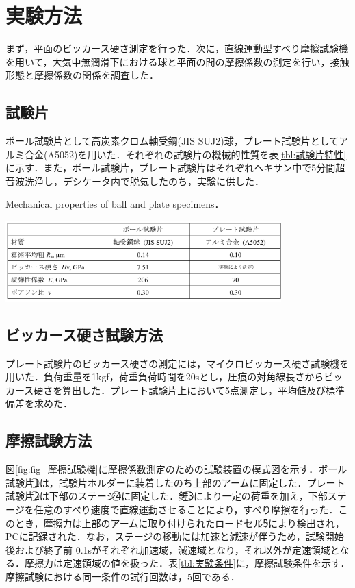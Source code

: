 \section{実験方法}
まず，平面のビッカース硬さ測定を行った．次に，直線運動型すべり摩擦試験機を用いて，大気中無潤滑下における球と平面の間の摩擦係数の測定を行い，接触形態と摩擦係数の関係を調査した．

\subsection{試験片}
ボール試験片として高炭素クロム軸受鋼(JIS SUJ2)球，プレート試験片としてアルミ合金(A5052)を用いた．それぞれの試験片の機械的性質を表\ref{tbl:試験片特性}に示す．また，ボール試験片，プレート試験片はそれぞれヘキサン中で5分間超音波洗浄し，デシケータ内で脱気したのち，実験に供した．

\begin{table}[htbp]
    \centering
    \caption{Mechanical properties of ball and plate specimens．} %
    \label{tbl:試験片特性} %
    \includegraphics[width=0.8\textwidth]{fig/fig_試験片特性.png} %
\end{table}

\subsection{ビッカース硬さ試験方法}
プレート試験片のビッカース硬さの測定には，マイクロビッカース硬さ試験機を用いた．負荷重量を1kgf，荷重負荷時間を20sとし，圧痕の対角線長さからビッカース硬さを算出した．プレート試験片上において5点測定し，平均値及び標準偏差を求めた．

\subsection{摩擦試験方法}
図\ref{fig:fig_摩擦試験機}に摩擦係数測定のための試験装置の模式図を示す．ボール試験片\textcircled{\scriptsize 1}は，試験片ホルダーに装着したのち上部のアームに固定した．プレート試験片\textcircled{\scriptsize 2}は下部のステージ\textcircled{\scriptsize 4}に固定した．錘\textcircled{\scriptsize 3}により一定の荷重を加え，下部ステージを任意のすべり速度で直線運動させることにより，すべり摩擦を行った．このとき，摩擦力は上部のアームに取り付けられたロードセル\textcircled{\scriptsize 5}により検出され，PCに記録された．なお，ステージの移動には加速と減速が伴うため，試験開始後および終了前 0.1sがそれぞれ加速域，減速域となり，それ以外が定速領域となる．摩擦力は定速領域の値を扱った．表\ref{tbl:実験条件}に，摩擦試験条件を示す．摩擦試験における同一条件の試行回数は，5回である．

